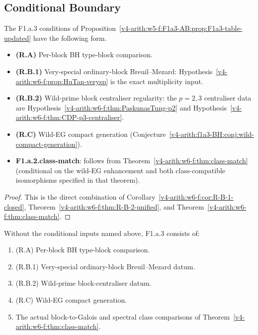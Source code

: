 \subsection{Conditional Boundary}

\begin{theorem}
\label{v4-arith:w6-f:thm:table-updated}
The F1.a.3 conditions of
Proposition~\ref{v4-arith:w5-f:F1a3-AB:prop:F1a3-table-updated} have the
following form.
\begin{itemize}
\item \textbf{(R.A)} Per-block BH type-block comparison.
\item \textbf{(R.B.1)} Very-special ordinary-block Breuil--Mezard:
Hypothesis~\ref{v4-arith:w6-f:prop:HuTan-verysp} is the exact multiplicity input.
\item \textbf{(R.B.2)} Wild-prime block centraliser regularity:
the \(p=2,3\) centraliser data are
Hypothesis~\ref{v4-arith:w6-f:thm:PaskunasTung-p2} and
Hypothesis~\ref{v4-arith:w6-f:thm:CDP-p3-centraliser}.
\item \textbf{(R.C)} Wild-EG compact generation
(Conjecture~\ref{v4-arith:f1a3-BH:conj:wild-compact-generation}).
\item \textbf{F1.a.2.class-match}: follows from
Theorem~\ref{v4-arith:w6-f:thm:class-match} (conditional on the
wild-EG enhancement and both class-compatible isomorphisms
specified in that theorem).
\end{itemize}
\end{theorem}

\begin{proof}
This is the direct combination of
Corollary~\ref{v4-arith:w6-f:cor:R-B-1-closed},
Theorem~\ref{v4-arith:w6-f:thm:R-B-2-unified}, and
Theorem~\ref{v4-arith:w6-f:thm:class-match}.
\end{proof}

\begin{corollary}
\label{v4-arith:w6-f:cor:surviving-table}
Without the conditional inputs named above,
F1.a.3 consists of:
\begin{enumerate}
\item (R.A) Per-block BH type-block comparison.
\item (R.B.1) Very-special ordinary-block Breuil--Mezard datum.
\item (R.B.2) Wild-prime block-centraliser datum.
\item (R.C) Wild-EG compact generation.
\item The actual block-to-Galois and spectral class comparisons of
Theorem~\ref{v4-arith:w6-f:thm:class-match}.
\end{enumerate}
\end{corollary}

